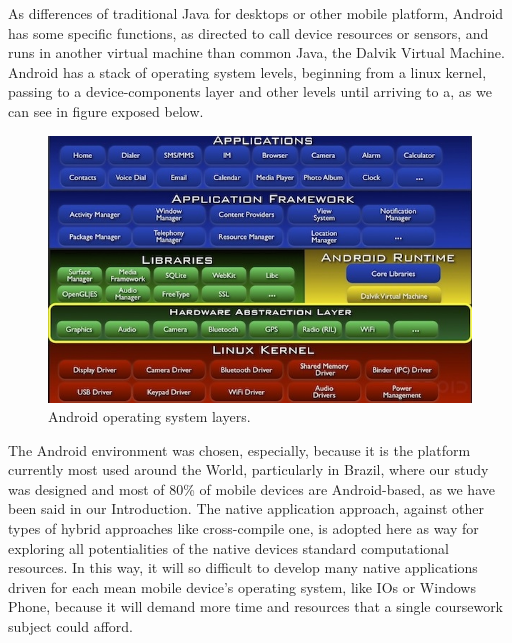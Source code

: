 As differences of traditional Java for desktops or other mobile platform, Android has some specific functions, as directed to call device resources or sensors, and runs in another virtual machine than common Java, the Dalvik Virtual Machine. Android has a stack of operating system levels, beginning from a linux kernel, passing to a device-components layer and other levels until arriving to a, as we can see in figure exposed below.
		
		\begin{figure}[htp]
			\begin{center}
				\includegraphics[scale=1.5]{chapters/desenvolvimento/img/android.png}
				\caption{Android operating system layers.}
				\label{Android-Schema}
			\end{center}
		\end{figure}
		
The Android environment was chosen, especially, because it is the platform currently most used around the World, particularly in Brazil, where our study was designed and most of 80\% of mobile devices are Android-based, as we have been said in our Introduction. The native application approach, against other types of hybrid approaches like cross-compile one, is adopted here as way for exploring all potentialities of the native devices standard computational resources. In this way, it will so difficult to develop many native applications driven for each mean mobile device's operating system, like IOs or Windows Phone, because it will demand more time and resources that a single coursework subject could afford.
		
